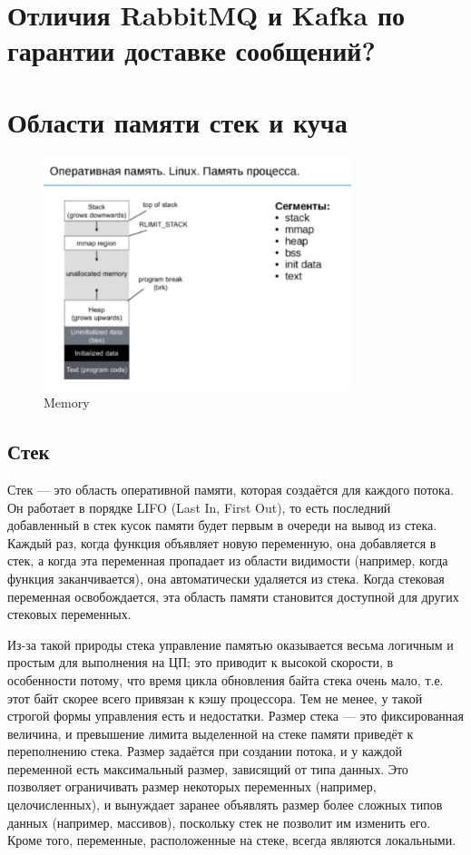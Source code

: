 \section{Отличия RabbitMQ и Kafka по гарантии доставке сообщений?}
\section{Области памяти стек и куча}

\begin{figure}[h!]
\centering
\includegraphics[width=0.8\textwidth]{img/memory.png}
\caption{Memory}
\label{memory}
\end{figure}

\subsection{Стек}

Стек — это область оперативной памяти, которая создаётся для каждого потока. Он работает в порядке LIFO (Last In, First Out),  то есть последний добавленный в стек кусок памяти будет первым в очереди на вывод из стека. Каждый раз, когда функция объявляет новую переменную, она добавляется в стек, а когда эта переменная пропадает из области видимости (например, когда функция заканчивается), она автоматически удаляется из стека. Когда стековая переменная освобождается, эта область памяти становится доступной для других стековых переменных.

Из-за такой природы стека управление памятью оказывается весьма логичным и простым для выполнения на ЦП; это приводит к высокой скорости, в особенности потому, что время цикла обновления байта стека очень мало, т.е. этот байт скорее всего привязан к кэшу процессора. Тем не менее, у такой строгой формы управления есть и недостатки. Размер стека — это фиксированная величина, и превышение лимита выделенной на стеке памяти приведёт к переполнению стека. Размер задаётся при создании потока, и у каждой переменной есть максимальный размер, зависящий от типа данных. Это позволяет ограничивать размер некоторых переменных (например, целочисленных), и вынуждает заранее объявлять размер более сложных типов данных (например, массивов), поскольку стек не позволит им изменить его. Кроме того, переменные, расположенные на стеке, всегда являются локальными.

